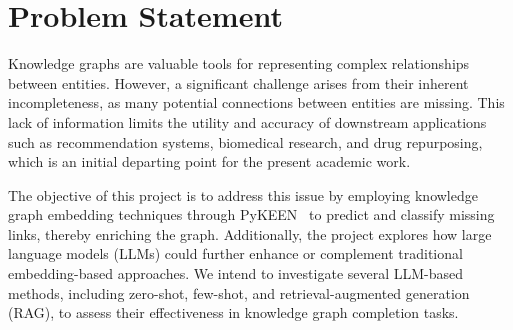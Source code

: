 \section*{Problem Statement}


Knowledge graphs are valuable tools for representing complex relationships between entities. However, a significant challenge arises from their inherent incompleteness, as many potential connections between entities are missing. This lack of information limits the utility and accuracy of downstream applications such as recommendation systems, biomedical research, and drug repurposing, which is an initial departing point for the present academic work.

The objective of this project is to address this issue by employing knowledge graph embedding techniques through PyKEEN~\cite{pykeen} to predict and classify missing links, thereby enriching the graph. Additionally, the project explores how large language models (LLMs) could further enhance or complement traditional embedding-based approaches. We intend to investigate several LLM-based methods, including zero-shot, few-shot, and retrieval-augmented generation (RAG), to assess their effectiveness in knowledge graph completion tasks.

